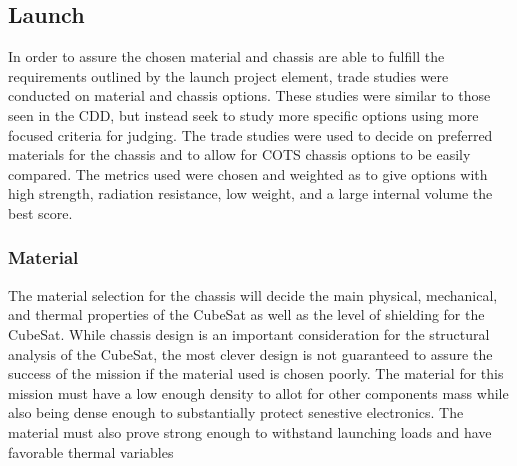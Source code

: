 
\subsection{Launch}
In order to assure the chosen material and chassis are able to fulfill the requirements outlined by the launch project element, trade studies were conducted on material and chassis options. These studies were similar to those seen in the CDD, but instead seek to study more specific options using more focused criteria for judging. The trade studies were used to decide on preferred materials for the chassis and to allow for COTS chassis options to be easily compared. The metrics used were chosen and weighted as to give options with high strength, radiation resistance, low weight, and a large internal volume the best score.
\subsubsection{Material}
The material selection for the chassis will decide the main physical, mechanical, and thermal properties of the CubeSat as well as the level of shielding for the CubeSat. While chassis design is an important consideration for the structural analysis of the CubeSat, the most clever design is not guaranteed to assure the success of the mission if the material used is chosen poorly. The material for this mission must have a low enough density to allot for other components mass while also being dense enough to substantially protect senestive electronics. The material must also prove strong enough to withstand launching loads and have favorable thermal variables
